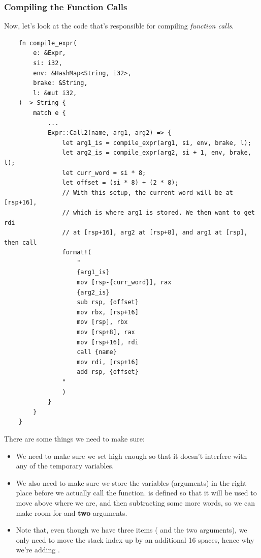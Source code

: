 \subsubsection{Compiling the Function Calls}
Now, let's look at the code that's responsible for compiling \emph{function calls}.
\begin{verbatim}
    fn compile_expr(
        e: &Expr,
        si: i32,
        env: &HashMap<String, i32>,
        brake: &String,
        l: &mut i32,
    ) -> String {
        match e {
            ...
            Expr::Call2(name, arg1, arg2) => {
                let arg1_is = compile_expr(arg1, si, env, brake, l);
                let arg2_is = compile_expr(arg2, si + 1, env, brake, l);
                let curr_word = si * 8;
                let offset = (si * 8) + (2 * 8);
                // With this setup, the current word will be at [rsp+16], 
                // which is where arg1 is stored. We then want to get rdi
                // at [rsp+16], arg2 at [rsp+8], and arg1 at [rsp], then call
                format!(
                    "
                    {arg1_is}
                    mov [rsp-{curr_word}], rax
                    {arg2_is}
                    sub rsp, {offset}
                    mov rbx, [rsp+16]
                    mov [rsp], rbx
                    mov [rsp+8], rax
                    mov [rsp+16], rdi
                    call {name}
                    mov rdi, [rsp+16]
                    add rsp, {offset}
                "
                )
            }
        }
    }\end{verbatim}
There are some things we need to make sure: 
\begin{itemize}
    \item We need to make sure we set  high enough so that it doesn't interfere with any of the temporary variables. 
    \item We also need to make sure we store the variables (arguments) in the right place before we actually call the function.  is defined so that it will be used to move  above where we are, and then subtracting some more words, so we can make room for  and \textbf{two} arguments. 
    \item Note that, even though we have three items ( and the two arguments), we only need to move the stack index up by an additional 16 spaces, hence why we're adding . %
\end{itemize}


